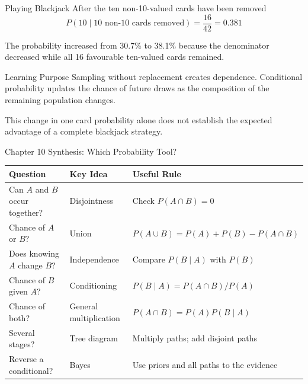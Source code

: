 \documentclass[aspectratio=169]{beamer}
\begin{document}
\begin{frame}{Playing Blackjack}
After the ten non-10-valued cards have been removed
$$P(10\mid\text{10 non-10 cards removed})=\frac{16}{42}=\mathbf{0.381}$$

The probability increased from 30.7\% to 38.1\% because the denominator decreased while all 16 favourable ten-valued cards remained.

\begin{block}{Learning Purpose}
Sampling without replacement creates dependence. Conditional probability updates the chance of future draws as the composition of the remaining population changes.
\end{block}

\small This change in one card probability alone does not establish the expected advantage of a complete blackjack strategy.
\end{frame}

\begin{frame}{Chapter 10 Synthesis: Which Probability Tool?}
  \begin{table}
    \centering
    \scriptsize
    \begin{tabularx}{\textwidth}{X X X}
      \toprule
      \textbf{Question} & \textbf{Key Idea} & \textbf{Useful Rule} \\
      \midrule
      Can $A$ and $B$ occur together? & Disjointness & Check $P(A\cap B)=0$ \\
      Chance of $A$ or $B$? & Union & $P(A\cup B)=P(A)+P(B)-P(A\cap B)$ \\
      Does knowing $A$ change $B$? & Independence & Compare $P(B\mid A)$ with $P(B)$ \\
      Chance of $B$ given $A$? & Conditioning & $P(B\mid A)=P(A\cap B)/P(A)$ \\
      Chance of both? & General multiplication & $P(A\cap B)=P(A)P(B\mid A)$ \\
      Several stages? & Tree diagram & Multiply paths; add disjoint paths \\
      Reverse a conditional? & Bayes & Use priors and all paths to the evidence \\
      \bottomrule
    \end{tabularx}
  \end{table}
\end{frame}
\end{document}
